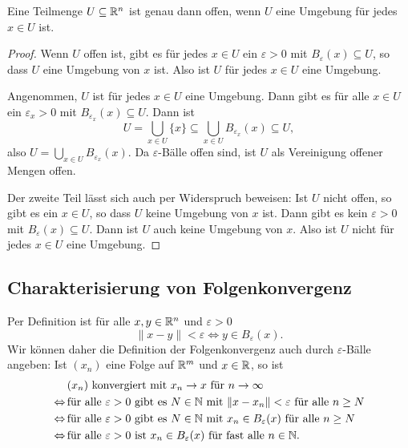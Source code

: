 \documentclass[a4paper,10pt]{article}
\begin{document}
\begin{lem}
 Eine Teilmenge $U \subseteq \mathbb{R}^n$ ist genau dann offen, wenn $U$ eine Umgebung für jedes $x \in U$ ist.
\end{lem}
\begin{proof}
 Wenn $U$ offen ist, gibt es für jedes $x \in U$ ein $\varepsilon > 0$ mit $B_\varepsilon(x) \subseteq U$, so dass $U$ eine Umgebung von $x$ ist. Also ist $U$ für jedes $x \in U$ eine Umgebung.
 
 Angenommen, $U$ ist für jedes $x \in U$ eine Umgebung. Dann gibt es für alle $x \in U$ ein $\varepsilon_x > 0$ mit $B_{\varepsilon_x}(x) \subseteq U$. Dann ist
 \[
  U = \bigcup_{x \in U} \{x\} \subseteq \bigcup_{x \in U} B_{\varepsilon_x}(x) \subseteq U,
 \]
 also $U = \bigcup_{x \in U} B_{\varepsilon_x}(x)$. Da $\varepsilon$-Bälle offen sind, ist $U$ als Vereinigung offener Mengen offen.
 
 Der zweite Teil lässt sich auch per Widerspruch beweisen: Ist $U$ nicht offen, so gibt es ein $x \in U$, so dass $U$ keine Umgebung von $x$ ist. Dann gibt es kein $\varepsilon > 0$ mit $B_\varepsilon(x) \subseteq U$. Dann ist $U$ auch keine Umgebung von $x$. Also ist $U$ nicht für jedes $x \in U$ eine Umgebung.
\end{proof}


\subsection{Charakterisierung von Folgenkonvergenz}


Per Definition ist für alle $x, y \in \mathbb{R}^n$ und $\varepsilon > 0$
\[
 \|x-y\| < \varepsilon \Leftrightarrow y \in B_\varepsilon(x).
\]
Wir können daher die Definition der Folgenkonvergenz auch durch $\varepsilon$-Bälle angeben: Ist $(x_n)$ eine Folge auf $\mathbb{R}^m$ und $x \in \mathbb{R}$, so ist
\begin{align*}
                 &\, \text{$(x_n)$ konvergiert mit $x_n \to x$ für $n \to \infty$   } \\
 \Leftrightarrow &\, \text{für alle $\varepsilon > 0$ gibt es $N \in \mathbb{N}$ mit $\|x - x_n\| < \varepsilon$ für alle $n \geq N$} \\
 \Leftrightarrow &\, \text{für alle $\varepsilon > 0$ gibt es $N \in \mathbb{N}$ mit $x_n \in B_\varepsilon(x)$ für alle $n \geq N$} \\
 \Leftrightarrow &\, \text{für alle $\varepsilon > 0$ ist $x_n \in B_\varepsilon(x)$ für fast alle $n \in \mathbb{N}$}.
\end{align*}
\end{document}
